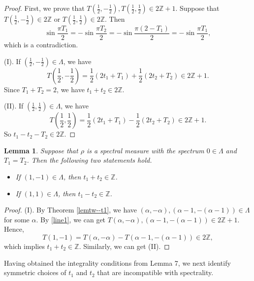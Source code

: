 \documentclass[12pt,a4paper,intlimits,sumlimits]{amsart}
\theoremstyle{plain}
\newtheorem{lemma}{Lemma}
\theoremstyle{definition}
\newcommand{\ZZ}{{\mathbb Z}}
\newcounter{rem}
\begin{document}
\begin{proof} First, we prove that $T (\frac{1}{2}, -\frac{1}{2}) , T(\frac{1}{2},  \frac{1}{2}) \in 2\mathbb{Z}+1$. Suppose that $T (\frac{1}{2}, -\frac{1}{2})\in 2\mathbb{Z}$ or $T(\frac{1}{2},  \frac{1}{2}) \in 2\mathbb{Z}$. Then
$$ \sin \frac{\pi T_1}{2}= - \sin \frac{\pi T_2}{2}  = - \sin \frac{\pi (2-T_1)}{2}=-\sin \frac{\pi T_1}{2},$$
which is a contradiction.

  (I). If $(\frac{1}{2}, -\frac{1}{2})\in\Lambda$,  we have $$T (\frac{1}{2}, -\frac{1}{2})= \frac{1}{2}\left(2 t_1+T_1\right)+\frac{1}{2}\left(2 t_2+T_2\right)\in 2\mathbb{Z}+1.$$
Since $T_1+T_2=2$, we have $ t_1+   t_2 \in 2\mathbb{Z}$.

  (II). If $(\frac{1}{2},  \frac{1}{2})\in\Lambda$,  we have $$T (\frac{1}{2}, \frac{1}{2})= \frac{1}{2}\left(2 t_1+T_1\right)-\frac{1}{2}\left(2 t_2+T_2\right)\in 2\mathbb{Z}+1.$$
So $ t_1- t_2- T_2 \in 2\mathbb{Z}$.

\end{proof}
 
\begin{lemma}\label{lemtwo1-5}
Suppose that $\rho $ is a spectral measure with the spectrum $0\in\Lambda$ and $T_1=T_2$. Then the following two statements hold.
\begin{itemize}
\item[(I)] If $(1, -1)\in\Lambda$, then $t_1+t_2\in \mathbb{Z}$. 
\item[(II)]  If $(1, 1)\in\Lambda$, then $t_1-t_2 \in  \mathbb{Z}$.
\end{itemize}
\end{lemma}
\begin{proof}
(I). By Theorem \ref{lemtw--t1}, we have $(\alpha, -\alpha),(\alpha-1, -(\alpha-1)) \in\Lambda$  for some $\alpha$. By \eqref{line1}, we can get $ T(\alpha, -\alpha) , (\alpha-1, -(\alpha-1)) \in 2\mathbb{Z}+1$. Hence, 
$$T (1, -1) =T(\alpha, -\alpha)-T(\alpha-1, -(\alpha-1)) \in 2\mathbb{Z},$$ 
which implies $ t_1+t_2\in\ZZ$.
Similarly, we can get (II).

\end{proof}


 Having obtained the integrality conditions from Lemma 7, we next identify symmetric choices of 
$t_1$ and $t_2$
that are incompatible with spectrality.
 
\end{document}
